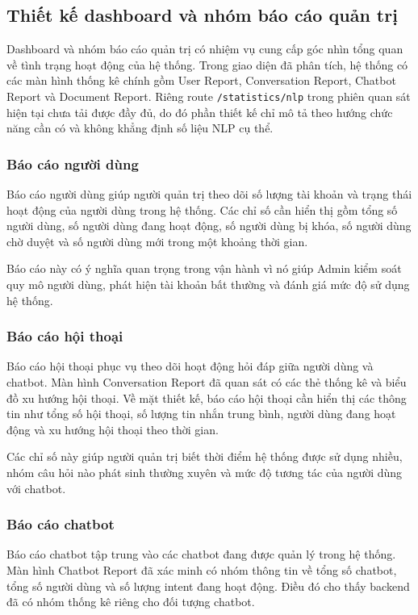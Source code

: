 \subsection{Thiết kế dashboard và nhóm báo cáo quản trị}

Dashboard và nhóm báo cáo quản trị có nhiệm vụ cung cấp góc nhìn tổng quan về tình trạng hoạt động của hệ thống. Trong giao diện đã phân tích, hệ thống có các màn hình thống kê chính gồm User Report, Conversation Report, Chatbot Report và Document Report. Riêng route \texttt{/statistics/nlp} trong phiên quan sát hiện tại chưa tải được đầy đủ, do đó phần thiết kế chỉ mô tả theo hướng chức năng cần có và không khẳng định số liệu NLP cụ thể.

\subsubsection{Báo cáo người dùng}

Báo cáo người dùng giúp người quản trị theo dõi số lượng tài khoản và trạng thái hoạt động của người dùng trong hệ thống. Các chỉ số cần hiển thị gồm tổng số người dùng, số người dùng đang hoạt động, số người dùng bị khóa, số người dùng chờ duyệt và số người dùng mới trong một khoảng thời gian.

Báo cáo này có ý nghĩa quan trọng trong vận hành vì nó giúp Admin kiểm soát quy mô người dùng, phát hiện tài khoản bất thường và đánh giá mức độ sử dụng hệ thống.

\subsubsection{Báo cáo hội thoại}

Báo cáo hội thoại phục vụ theo dõi hoạt động hỏi đáp giữa người dùng và chatbot. Màn hình Conversation Report đã quan sát có các thẻ thống kê và biểu đồ xu hướng hội thoại. Về mặt thiết kế, báo cáo hội thoại cần hiển thị các thông tin như tổng số hội thoại, số lượng tin nhắn trung bình, người dùng đang hoạt động và xu hướng hội thoại theo thời gian.

Các chỉ số này giúp người quản trị biết thời điểm hệ thống được sử dụng nhiều, nhóm câu hỏi nào phát sinh thường xuyên và mức độ tương tác của người dùng với chatbot.

\subsubsection{Báo cáo chatbot}

Báo cáo chatbot tập trung vào các chatbot đang được quản lý trong hệ thống. Màn hình Chatbot Report đã xác minh có nhóm thông tin về tổng số chatbot, tổng số người dùng và số lượng intent đang hoạt động. Điều đó cho thấy backend đã có nhóm thống kê riêng cho đối tượng chatbot.

